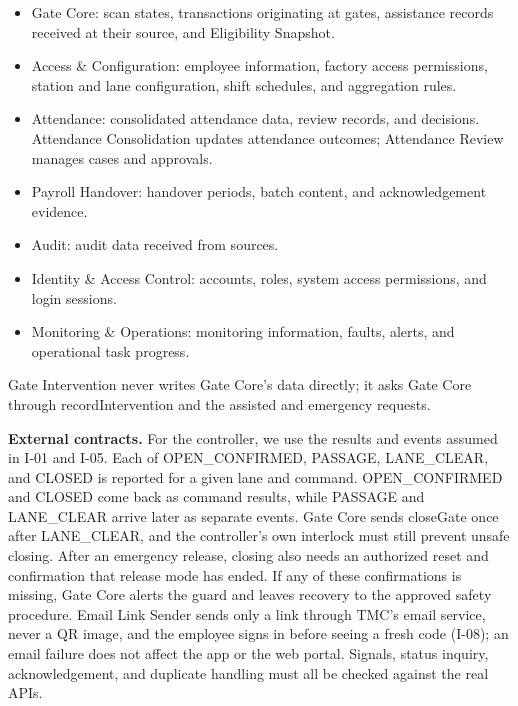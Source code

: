 \begin{itemize}[leftmargin=36pt, itemsep=2pt, topsep=4pt, parsep=2pt]
  \item Gate Core: scan states, transactions originating at gates, assistance records received at their source, and Eligibility Snapshot.
  \item Access \& Configuration: employee information, factory access permissions, station and lane configuration, shift schedules, and aggregation rules.
  \item Attendance: consolidated attendance data, review records, and decisions. Attendance Consolidation updates attendance outcomes; Attendance Review manages cases and approvals.
  \item Payroll Handover: handover periods, batch content, and acknowledgement evidence.
  \item Audit: audit data received from sources.
  \item Identity \& Access Control: accounts, roles, system access permissions, and login sessions.
  \item Monitoring \& Operations: monitoring information, faults, alerts, and operational task progress.
\end{itemize}

Gate Intervention never writes Gate Core's data directly; it asks Gate Core through recordIntervention and the assisted and emergency requests.

\textbf{External contracts.} For the controller, we use the results and events assumed in I-01 and I-05. Each of OPEN\_CONFIRMED, PASSAGE, LANE\_CLEAR, and CLOSED is reported for a given lane and command. OPEN\_CONFIRMED and CLOSED come back as command results, while PASSAGE and LANE\_CLEAR arrive later as separate events. Gate Core sends closeGate once after LANE\_CLEAR, and the controller's own interlock must still prevent unsafe closing. After an emergency release, closing also needs an authorized reset and confirmation that release mode has ended. If any of these confirmations is missing, Gate Core alerts the guard and leaves recovery to the approved safety procedure. Email Link Sender sends only a link through TMC's email service, never a QR image, and the employee signs in before seeing a fresh code (I-08); an email failure does not affect the app or the web portal. Signals, status inquiry, acknowledgement, and duplicate handling must all be checked against the real APIs.


